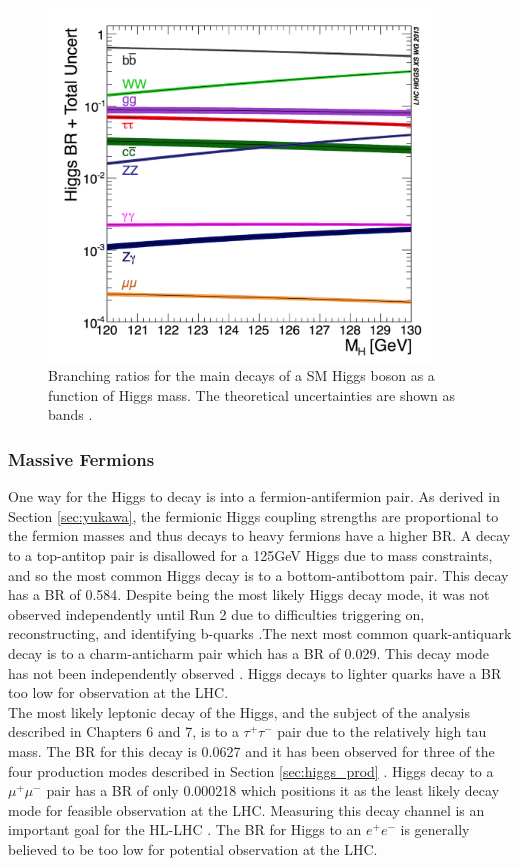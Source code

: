 \begin{figure}[h]
    \centering
    \includegraphics[width=4in]{figures/chapter1/higgs_brs.png}
    \caption{Branching ratios for the main decays of a SM Higgs boson as a function of Higgs mass. The theoretical uncertainties are shown as bands \cite{pdg}.}
    \label{fig:higgs_br}
\end{figure}

\subsubsection{Massive Fermions}
One way for the Higgs to decay is into a fermion-antifermion pair. As derived in Section \ref{sec:yukawa}, the fermionic Higgs coupling strengths are proportional to the fermion masses and thus decays to heavy fermions have a higher BR. A decay to a top-antitop pair is disallowed for a 125GeV Higgs due to mass constraints, and so the most common Higgs decay is to a bottom-antibottom pair. This decay has a BR of 0.584. Despite being the most likely Higgs decay mode, it was not observed independently until Run 2 due to difficulties triggering on, reconstructing, and identifying b-quarks \cite{higgs_bbar}.The next most common quark-antiquark decay is to a charm-anticharm pair which has a BR of 0.029. This decay mode has not been independently observed \cite{higgs_ccbar}. Higgs decays to lighter quarks have a BR too low for observation at the LHC.\\

The most likely leptonic decay of the Higgs, and the subject of the analysis described in Chapters 6 and 7, is to a $\tau^+\tau^-$ pair due to the relatively high tau mass. The BR for this decay is 0.0627 and it has been observed for three of the four production modes described in Section \ref{sec:higgs_prod} \cite{higgs_tautau}. Higgs decay to a $\mu^+\mu^-$ pair has a BR of only 0.000218 which positions it as the least likely decay mode for feasible observation at the LHC. Measuring this decay channel is an important goal for the HL-LHC \cite{higgs_hllhc}. The BR for Higgs to an $e^+e^-$ is generally believed to be too low for potential observation at the LHC.\\

